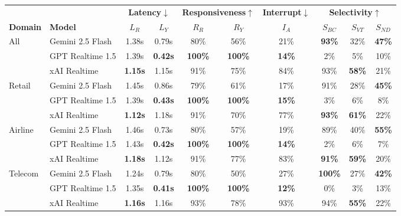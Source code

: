 \begin{tabular}{@{}ll|cc|cc|c|ccc@{}}
\toprule
 & & \multicolumn{2}{c|}{\textbf{Latency}$\downarrow$} & \multicolumn{2}{c|}{\textbf{Responsiveness}$\uparrow$} & \textbf{Interrupt}$\downarrow$ & \multicolumn{3}{c}{\textbf{Selectivity}$\uparrow$} \\
\textbf{Domain} & \textbf{Model} & $L_R$ & $L_Y$ & $R_R$ & $R_Y$ & $I_A$ & $S_{BC}$ & $S_{VT}$ & $S_{ND}$ \\
\midrule
\multirow{3}{*}{All} & Gemini 2.5 Flash & 1.38s & 0.79s & 80\% & 56\% & 21\% & \textbf{93\%} & 32\% & \textbf{47\%} \\
 & GPT Realtime 1.5 & 1.39s & \textbf{0.42s} & \textbf{100\%} & \textbf{100\%} & \textbf{14\%} & 2\% & 5\% & 10\% \\
 & xAI Realtime & \textbf{1.15s} & 1.15s & 91\% & 75\% & 84\% & 93\% & \textbf{58\%} & 21\% \\
\midrule
\multirow{3}{*}{Retail} & Gemini 2.5 Flash & 1.45s & 0.86s & 79\% & 61\% & 17\% & 91\% & 28\% & \textbf{45\%} \\
 & GPT Realtime 1.5 & 1.39s & \textbf{0.43s} & \textbf{100\%} & \textbf{100\%} & \textbf{15\%} & 3\% & 6\% & 8\% \\
 & xAI Realtime & \textbf{1.12s} & 1.18s & 91\% & 70\% & 77\% & \textbf{93\%} & \textbf{61\%} & 22\% \\
\midrule
\multirow{3}{*}{Airline} & Gemini 2.5 Flash & 1.46s & 0.73s & 80\% & 57\% & 19\% & 89\% & 40\% & \textbf{55\%} \\
 & GPT Realtime 1.5 & 1.43s & \textbf{0.42s} & \textbf{100\%} & \textbf{100\%} & \textbf{14\%} & 2\% & 6\% & 7\% \\
 & xAI Realtime & \textbf{1.18s} & 1.12s & 91\% & 77\% & 83\% & \textbf{91\%} & \textbf{59\%} & 20\% \\
\midrule
\multirow{3}{*}{Telecom} & Gemini 2.5 Flash & 1.24s & 0.79s & 80\% & 50\% & 27\% & \textbf{100\%} & 27\% & \textbf{42\%} \\
 & GPT Realtime 1.5 & 1.35s & \textbf{0.41s} & \textbf{100\%} & \textbf{100\%} & \textbf{12\%} & 0\% & 3\% & 13\% \\
 & xAI Realtime & \textbf{1.16s} & 1.16s & 93\% & 78\% & 93\% & 94\% & \textbf{55\%} & 22\% \\
\bottomrule
\end{tabular}